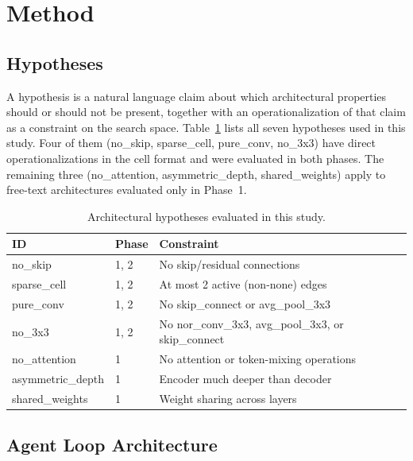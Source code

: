 \section{Method}
\label{sec:method}

\subsection{Hypotheses}
\label{sec:hypotheses}

A \haas{} hypothesis is a natural language claim about which architectural
properties should or should not be present, together with an operationalization
of that claim as a constraint on the search space. Table~\ref{tab:hypotheses}
lists all seven hypotheses used in this study. Four of them (no\_skip,
sparse\_cell, pure\_conv, no\_3x3) have direct operationalizations in the
\nasbench{} cell format and were evaluated in both phases. The remaining three
(no\_attention, asymmetric\_depth, shared\_weights) apply to free-text
architectures evaluated only in Phase~1.

\begin{table}[t]
\caption{Architectural hypotheses evaluated in this study.}
\label{tab:hypotheses}
\begin{center}
\small
\begin{tabular}{llp{5.5cm}}
\toprule
\textbf{ID} & \textbf{Phase} & \textbf{Constraint} \\
\midrule
no\_skip          & 1, 2 & No skip/residual connections \\
sparse\_cell      & 1, 2 & At most 2 active (non-none) edges \\
pure\_conv        & 1, 2 & No skip\_connect or avg\_pool\_3x3 \\
no\_3x3           & 1, 2 & No nor\_conv\_3x3, avg\_pool\_3x3, or skip\_connect \\
no\_attention     & 1    & No attention or token-mixing operations \\
asymmetric\_depth & 1    & Encoder much deeper than decoder \\
shared\_weights   & 1    & Weight sharing across layers \\
\bottomrule
\end{tabular}
\end{center}
\end{table}

\subsection{Agent Loop Architecture}
\label{sec:loop}

